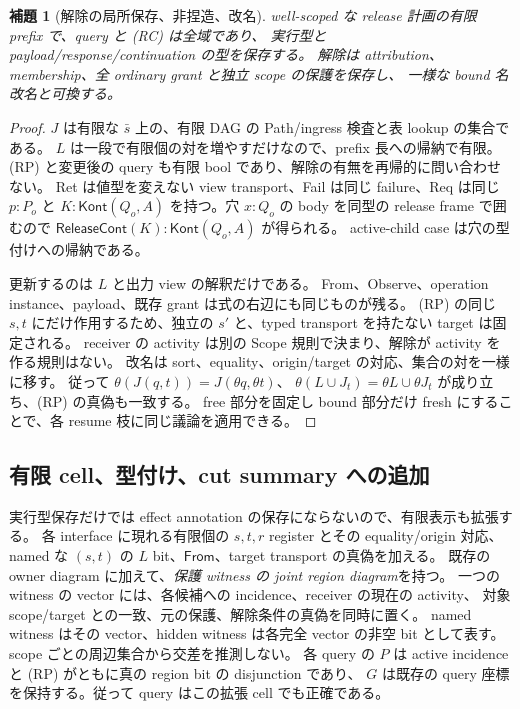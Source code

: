 \documentclass[11pt,a4paper]{article}
\newtheorem{lemma}[definition]{補題}
\begin{document}
\begin{lemma}[解除の局所保存、非捏造、改名]
\label{lem:release-local}
well-scoped な release 計画の有限 prefix で、query と (RC) は全域であり、
実行型と payload/response/continuation の型を保存する。
解除は attribution、membership、全 ordinary grant と独立 scope の保護を保存し、
一様な bound 名改名と可換する。
\end{lemma}
\begin{proof}
\(J\) は有限な \(\bar s\) 上の、有限 DAG の Path/ingress 検査と表 lookup の集合である。
\(L\) は一段で有限個の対を増やすだけなので、prefix 長への帰納で有限。
(RP) と変更後の query も有限 bool であり、解除の有無を再帰的に問い合わせない。
Ret は値型を変えない view transport、Fail は同じ failure、Req は同じ \(p:P_o\) と
\(K:\mathsf{Kont}(Q_o,A)\) を持つ。穴 \(x:Q_o\) の body を同型の release frame で囲むので
\(\mathsf{ReleaseCont}(K):\mathsf{Kont}(Q_o,A)\) が得られる。
active-child case は穴の型付けへの帰納である。

更新するのは \(L\) と出力 view の解釈だけである。
From、Observe、operation instance、payload、既存 grant は式の右辺にも同じものが残る。
(RP) の同じ \(s,t\) にだけ作用するため、独立の \(s'\) と、typed transport を持たない target は固定される。
receiver の activity は別の Scope 規則で決まり、解除が activity を作る規則はない。
改名は sort、equality、origin/target の対応、集合の対を一様に移す。
従って \(\theta(J(q,t))=J(\theta q,\theta t)\)、
\(\theta(L\cup J_t)=\theta L\cup\theta J_t\) が成り立ち、(RP) の真偽も一致する。
free 部分を固定し bound 部分だけ fresh にすることで、各 resume 枝に同じ議論を適用できる。
\end{proof}

\subsection{有限 cell、型付け、cut summary への追加}

実行型保存だけでは effect annotation の保存にならないので、有限表示も拡張する。
各 interface に現れる有限個の \(s,t,r\) register とその equality/origin 対応、
named な \((s,t)\) の \(L\) bit、\(\mathsf{From}\)、target transport の真偽を加える。
既存の owner diagram に加えて、\emph{保護 witness の joint region diagram}を持つ。
一つの witness の vector には、各候補への incidence、receiver の現在の activity、
対象 scope/target との一致、元の保護、解除条件の真偽を同時に置く。
named witness はその vector、hidden witness は各完全 vector の非空 bit として表す。
scope ごとの周辺集合から交差を推測しない。
各 query の \(P\) は active incidence と (RP) がともに真の region bit の disjunction であり、
\(G\) は既存の query 座標を保持する。従って query はこの拡張 cell でも正確である。
\end{document}
